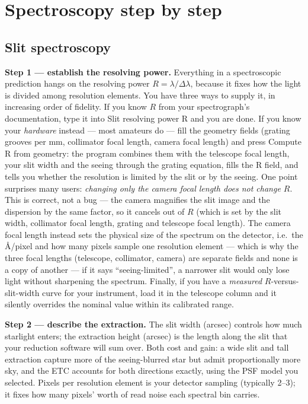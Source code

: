 \section{Spectroscopy step by step}
\label{sec:spec-guide}

\subsection{Slit spectroscopy}

\textbf{Step 1 — establish the resolving power.} Everything in a
spectroscopic prediction hangs on the resolving power
$R = \lambda/\Delta\lambda$, because it fixes how the light is divided
among resolution elements. You have three ways to supply it, in
increasing order of fidelity. If you know $R$ from your spectrograph's
documentation, type it into \textsf{Slit resolving power R} and you are
done. If you know your \emph{hardware} instead --- most amateurs do ---
fill the geometry fields (grating grooves per mm, collimator focal
length, camera focal length) and press \textsf{Compute R from geometry}:
the program combines them with the telescope focal length, your slit
width and the seeing through the grating equation, fills the R field,
and tells you whether the resolution is limited by the slit or by the
seeing. One point surprises many users: \emph{changing only the camera
focal length does not change $R$}. This is correct, not a bug --- the
camera magnifies the slit image and the dispersion by the same factor, so
it cancels out of $R$ (which is set by the slit width, collimator focal
length, grating and telescope focal length). The camera focal length
instead sets the physical size of the spectrum on the detector, i.e.\ the
\si{\angstrom}/pixel and how many pixels sample one resolution element ---
which is why the three focal lengths (telescope, collimator, camera) are
separate fields and none is a copy of another --- if it says ``seeing-limited'', a narrower slit would only lose
light without sharpening the spectrum. Finally, if you have a
\emph{measured} $R$-versus-slit-width curve for your instrument, load it
in the telescope column and it silently overrides the nominal value
within its calibrated range.

\textbf{Step 2 — describe the extraction.} The slit width (arcsec)
controls how much starlight enters; the extraction height (arcsec) is
the length along the slit that your reduction software will sum over.
Both cost and gain: a wide slit and tall extraction capture more of the
seeing-blurred star but admit proportionally more sky, and the ETC
accounts for both directions exactly, using the PSF model you selected.
\textsf{Pixels per resolution element} is your detector sampling
(typically 2--3); it fixes how many pixels' worth of read noise each
spectral bin carries.

